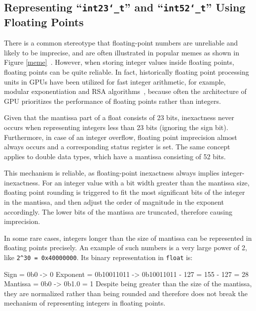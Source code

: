 \documentclass[logo,bsc,singlespacing,parskip]{infthesis}
\newcommand{\dtfloat}{\texttt{float}}
\newcommand{\dtfloati}{\texttt{int23\char`_t}}
\newcommand{\dtdoublei}{\texttt{int52\char`_t}}
\newenvironment{VerbatimCompact}
  {\vspace*{-2.5mm}\VerbatimEnvironment
   \par\Verbatim}
  {\endVerbatim\vspace*{-2.4mm}}
\begin{document}
\subsection{Representing ``\dtfloati{}'' and ``\dtdoublei{}'' Using
Floating Points}
\label{sec:fpe2}

There is a common stereotype that floating-point numbers are unreliable and
likely to be imprecise, and are often illustrated in popular memes as shown in
Figure \ref{meme}~\cite{meme}. However, when storing integer values inside
floating points, floating points can be quite reliable. In fact, historically
floating point processing units in GPUs have been utilized for fast integer
arithmetic, for example, modular exponentiation \cite{intfpu-modexp} and RSA
algorithms~\cite{intfpu-rsa}, because often the architecture of GPU prioritizes
the performance of floating points rather than integers. 

Given that the mantissa part of a float consists of 23 bits,
inexactness never occurs when representing integers less than 23 bits (ignoring
the sign bit). Furthermore, in case of an integer overflow, floating point
imprecision almost always occurs and a corresponding status register is set.
The same concept applies to double data types, which have a mantissa consisting
of 52 bits.

This mechanism is reliable, as floating-point inexactness always implies
integer-inexactness. For an integer value with a bit width greater than the
mantissa size, floating point rounding is triggered to fit the most
significant bits of the integer in the mantissa, and then adjust the order of
magnitude in the exponent accordingly. The lower bits of the mantissa are
truncated, therefore causing imprecision. 

In some rare cases, integers longer than the size of mantissa can be represented
in floating points precisely. An example of such numbers is a very large power
of 2, like \texttt{2\^{}30 = 0x40000000}. Its binary representation in
\dtfloat{} is:
\begin{VerbatimCompact}
Sign     = 0b0        -> 0     
Exponent = 0b10011011 -> 0b10011011 - 127 = 155 - 127 = 28             
Mantissa = 0b0        -> 0b1.0 = 1
\end{VerbatimCompact}
Despite being greater than the size of
the mantissa, they are normalized rather than being rounded and therefore does
not break the mechanism of representing integers in floating points.


\end{document}
